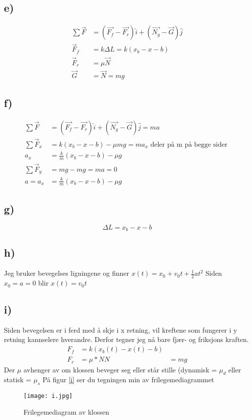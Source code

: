 \documentclass[a4paper,12pt,norsk]{article}
\begin{document}
\subsection*{e)}
\begin{align*}
\sum \vec{F} &= (\vec{F_f}  -\vec{F_r})\hat{i}+(\vec{N_g} - \vec{G})\hat{j}\\
\vec{F}_f &= k\Delta{L} = k(x_b-x-b)\\
\vec{F}_r &= \mu \vec{N}\\
\vec{G} &= \vec{N} = mg
\end{align*}

\subsection*{f)}

\begin{align*}
\sum \vec{F} &= (\vec{F_f}  -\vec{F_r})\hat{i}+(\vec{N_g} - \vec{G})\hat{j} = ma\\
\sum \vec{F}_x &= k(x_b-x-b) - \mu mg = ma_x \textrm{ deler på m på begge sider }\\
a_x &= \frac{k}{m}(x_b-x-b) -\mu g\\
\sum \vec{F}_y &= mg - mg = ma = 0\\
a = a_x &= \frac{k}{m}(x_b-x-b) -\mu g
\end{align*}

\subsection*{g)}
$$\Delta{L} = x_b - x - b$$

\subsection*{h)}
Jeg bruker bevegelses ligningene og finner $x(t) = x_0 + v_0t + \frac{1}{2}at^2$
Siden $x_0 = a = 0$ blir $x(t) = v_0t$

\subsection*{i)}
Siden bevegelsen er i ferd med å skje i x retning, vil kreftene som fungerer i y retning kannselere hverandre. Derfor tegner jeg nå bare fjær- og friksjons kraften. 
\begin{align*}
F_f &= k(x_b(t)-x(t)-b)\\
F_r &= \mu * N
N &= mg 
\end{align*}
Der $\mu$ avhenger av om klossen beveger seg eller står stille (dynamisk = $\mu_d$ eller statisk = $\mu_s$
På figur \vref{i} ser du tegningen min av frilegemediagrammet
\begin{figure}[h!]
\texttt{[image: i.jpg]} 
\caption{Frilegemediagram av klossen}
\label{i}
\end{figure} 
\end{document}

